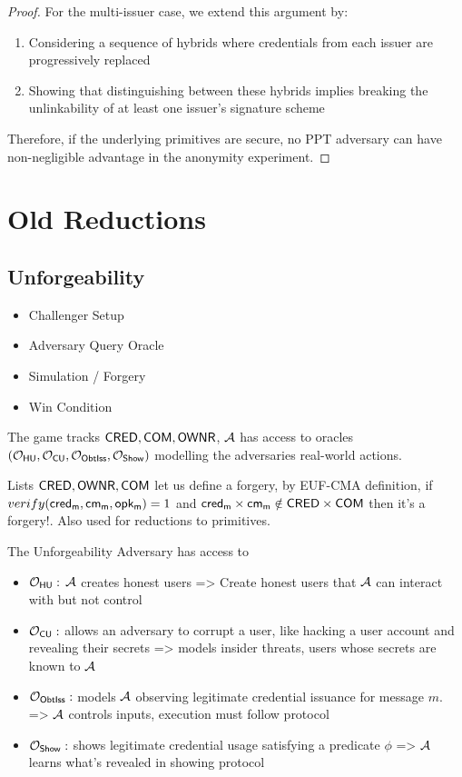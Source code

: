 \begin{proof}
\noindent For the multi-issuer case, we extend this argument by:
\begin{enumerate}
    \item Considering a sequence of hybrids where credentials from each issuer are progressively replaced
    
    \item Showing that distinguishing between these hybrids implies breaking the unlinkability of at least one issuer's signature scheme
\end{enumerate}

\noindent Therefore, if the underlying primitives are secure, no PPT adversary can have non-negligible advantage in the anonymity experiment.
\end{proof}










\section{Old Reductions}
\subsection{Unforgeability}
\begin{itemize}
    \item Challenger Setup
    \item Adversary Query Oracle
    \item Simulation / Forgery
    \item Win Condition
\end{itemize}
The game tracks $\mathsf{CRED}, \mathsf{COM}, \mathsf{OWNR}$, $\mathcal{A}$ has access to oracles $(\mathcal{O}_{\mathsf{HU}}, \mathcal{O}_{\mathsf{CU}}, \mathcal{O}_{\mathsf{ObtIss}}, \mathcal{O}_{\mathsf{Show}})$ modelling the adversaries real-world actions. 

Lists $\mathsf{CRED}, \mathsf{OWNR}, \mathsf{COM}$ let us define a forgery, by EUF-CMA definition, if $verify(\mathsf{cred_m}, \mathsf{cm_m}, \mathsf{opk_m}) = 1$ and $\mathsf{cred_m} \times \mathsf{cm_m} \notin \mathsf{CRED} \times \mathsf{COM}$ then it's a forgery!. Also used for reductions to primitives.

The Unforgeability Adversary has access to 
\begin{itemize}
    \item $\mathcal{O}_{\mathsf{HU}}:$ $\mathcal{A}$ creates honest users => Create honest users that $\mathcal{A}$ can interact with but not control
    \item $\mathcal{O}_{\mathsf{CU}}:$ allows an adversary to corrupt a user, like hacking a user account and revealing their secrets => models insider threats, users whose secrets are known to $\mathcal{A}$
    \item $\mathcal{O}_{\mathsf{ObtIss}}:$ models $\mathcal{A}$ observing legitimate credential issuance for message $m$. => $\mathcal{A}$ controls inputs, execution must follow protocol
    \item $\mathcal{O}_{\mathsf{Show}}:$ shows legitimate credential usage satisfying a predicate $\phi$ => $\mathcal{A}$ learns what's revealed in showing protocol
\end{itemize}


